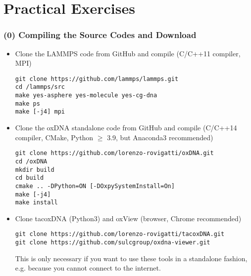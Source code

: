 \documentclass[slidestop,compress,9pt]{beamer}
\begin{document}
\section{Practical Exercises}

\begin{frame}[fragile]
\frametitle{(0) Compiling the Source Codes and Download}
\small

\begin{itemize}
\item Clone the LAMMPS code from GitHub and compile (C/C++11 compiler, MPI)
\begin{lstlisting}
git clone https://github.com/lammps/lammps.git
cd /lammps/src
make yes-asphere yes-molecule yes-cg-dna
make ps
make [-j4] mpi
\end{lstlisting}
\item Clone the oxDNA standalone code from GitHub and compile (C/C++14 compiler, CMake, Python $\ge$ 3.9, but Anaconda3 recommended)
\begin{lstlisting}
git clone https://github.com/lorenzo-rovigatti/oxDNA.git
cd /oxDNA
mkdir build
cd build
cmake .. -DPython=ON [-DOxpySystemInstall=On]
make [-j4]
make install
\end{lstlisting}
\item Clone tacoxDNA (Python3) and oxView (browser, Chrome recommended)
\begin{lstlisting}
git clone https://github.com/lorenzo-rovigatti/tacoxDNA.git
git clone https://github.com/sulcgroup/oxdna-viewer.git
\end{lstlisting}
This is only necessary if you want to use these tools in a standalone fashion, e.g. because you cannot connect to the internet.
\end{itemize}

\end{frame}
\end{document}
